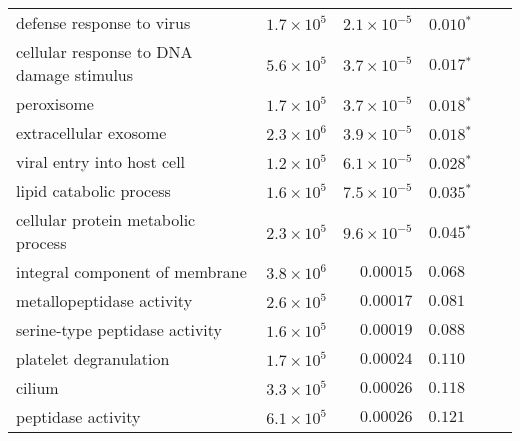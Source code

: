\begin{longtable}{|l|r|r|r|r|r|}
    defense response to virus                           & $1.7\times 10^{5}$ & $2.1\times 10^{-5}$  & $\bm{ 0.010{^*}}$                                        \\
    cellular response to DNA damage stimulus            & $5.6\times 10^{5}$ & $3.7\times 10^{-5}$  & $\bm{ 0.017{^*}}$                                        \\
    peroxisome                                          & $1.7\times 10^{5}$ & $3.7\times 10^{-5}$  & $\bm{ 0.018{^*}}$                                        \\
    extracellular exosome                               & $2.3\times 10^{6}$ & $3.9\times 10^{-5}$  & $\bm{ 0.018{^*}}$                                        \\
    viral entry into host cell                          & $1.2\times 10^{5}$ & $6.1\times 10^{-5}$  & $\bm{ 0.028{^*}}$                                        \\
    lipid catabolic process                             & $1.6\times 10^{5}$ & $7.5\times 10^{-5}$  & $\bm{ 0.035{^*}}$                                        \\
    cellular protein metabolic process                  & $2.3\times 10^{5}$ & $9.6\times 10^{-5}$  & $\bm{ 0.045{^*}}$                                        \\
    integral component of membrane                      & $3.8\times 10^{6}$ & $0.00015$            & $ 0.068~~$                                               \\
    metallopeptidase activity                           & $2.6\times 10^{5}$ & $0.00017$            & $ 0.081~~$                                               \\
    serine-type peptidase activity                      & $1.6\times 10^{5}$ & $0.00019$            & $ 0.088~~$                                               \\
    platelet degranulation                              & $1.7\times 10^{5}$ & $0.00024$            & $ 0.110~~$                                               \\
    cilium                                              & $3.3\times 10^{5}$ & $0.00026$            & $ 0.118~~$                                               \\
    peptidase activity                                  & $6.1\times 10^{5}$ & $0.00026$            & $ 0.121~~$                                               \\

\end{longtable}
